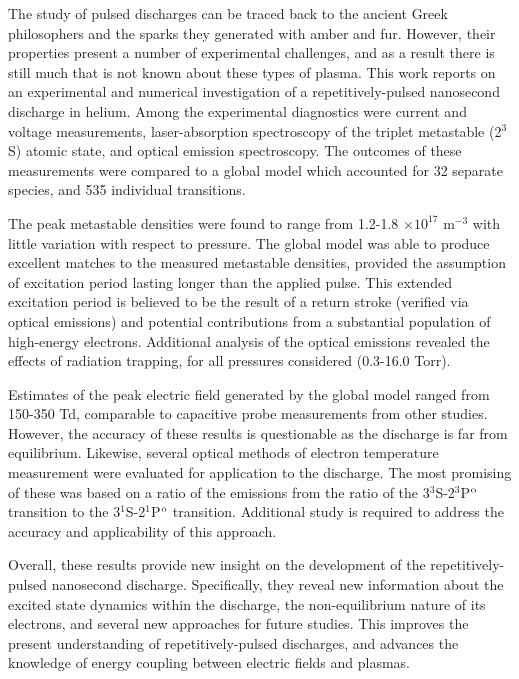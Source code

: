 The study of pulsed discharges can be traced back to the ancient Greek
philosophers and the sparks they generated with amber and fur. However, their
properties present a number of experimental challenges, and as a result there is
still much that is not known about these types of plasma. This work reports on
an experimental and numerical investigation of a repetitively-pulsed nanosecond
discharge in helium. Among the experimental diagnostics were current and voltage
measurements, laser-absorption spectroscopy of the triplet metastable (2$^3$S)
atomic state, and optical emission spectroscopy. The outcomes of these
measurements were compared to a global model which accounted for 32 separate
species, and 535 individual transitions.

The peak metastable densities were found to range from 1.2-1.8 $\times10^{17}$
m$^{-3}$ with little variation with respect to pressure. The global model was
able to produce excellent matches to the measured metastable densities, provided
the assumption of excitation period lasting longer than the applied pulse. This
extended excitation period is believed to be the result of a return stroke
(verified via optical emissions) and potential contributions from a substantial
population of high-energy electrons. Additional analysis of the optical
emissions revealed the effects of radiation trapping, for all pressures
considered (0.3-16.0 Torr).

Estimates of the peak electric field generated by the global model ranged from
150-350 Td, comparable to capacitive probe measurements from other studies.
However, the accuracy of these results is questionable as the discharge is far
from equilibrium. Likewise, several optical methods of electron temperature
measurement were evaluated for application to the discharge. The most promising
of these was based on a ratio of the emissions from the ratio of the
3$^3$S-2$^3$P$^\mathrm{o}$ transition to the 3$^1$S-2$^1$P$^\mathrm{o}$ transition. Additional
study is required to address the accuracy and applicability of this approach.

Overall, these results provide new insight on the development of the
repetitively-pulsed nanosecond discharge. Specifically, they reveal new
information about the excited state dynamics within the discharge, the
non-equilibrium nature of its electrons, and several new approaches for future
studies. This improves the present understanding of repetitively-pulsed
discharges, and advances the knowledge of energy coupling between electric
fields and plasmas.
